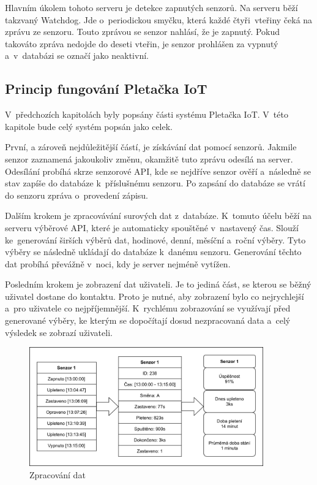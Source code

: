 \documentclass[12pt, a4paper]{article}
\begin{document}
Hlavním úkolem tohoto serveru je detekce zapnutých senzorů.
Na serveru běží takzvaný Watchdog.
Jde o~periodickou smyčku, která každé čtyři~vteřiny čeká na zprávu ze senzoru.
Touto zprávou se senzor nahlásí, že je zapnutý. Pokud takováto zpráva nedojde do deseti vteřin, je senzor prohlášen za vypnutý a~v~databázi se označí jako neaktivní.



\subsection*{Princip fungování Pletačka IoT}
V~předchozích kapitolách byly popsány části systému Pletačka IoT.
V~této kapitole bude celý systém popsán jako celek.

První, a zároveň nejdůležitější částí, je získávání dat pomocí senzorů.
Jakmile senzor zaznamená jakoukoliv změnu, okamžitě tuto zprávu odesílá na server.
Odesílání probíhá skrze senzorové API, kde se nejdříve senzor ověří a~následně se stav zapíše do databáze k~příslušnému senzoru.
Po zapsání do databáze se vrátí do senzoru zpráva o~provedení zápisu. 

Dalším krokem je zpracovávání surových dat z~databáze.
K~tomuto účelu běží na serveru výběrové API, které je automaticky spouštěné v~nastavený čas.
Slouží ke~generování širších výběrů dat, hodinové, denní, měsíční a~roční výběry.
Tyto výběry se následně ukládají do databáze k~danému senzoru.
Generování těchto dat probíhá převážně v~noci, kdy je server nejméně vytížen.

Posledním krokem je zobrazení dat uživateli.
Je to jediná část, se kterou se běžný uživatel dostane do kontaktu.
Proto je nutné, aby zobrazení bylo co nejrychlejší a~pro uživatele co nejpříjemnější.
K~rychlému zobrazování se využívají před generované výběry, ke kterým se dopočítají dosud nezpracovaná data a~celý výsledek se zobrazí uživateli.

\begin{figure}[t]
    \centering
    \includegraphics[width=0.9\textwidth]{img/Princip.png}
    \caption{Zpracování dat}
    \label{fig:princip}
\end{figure}
\end{document}
